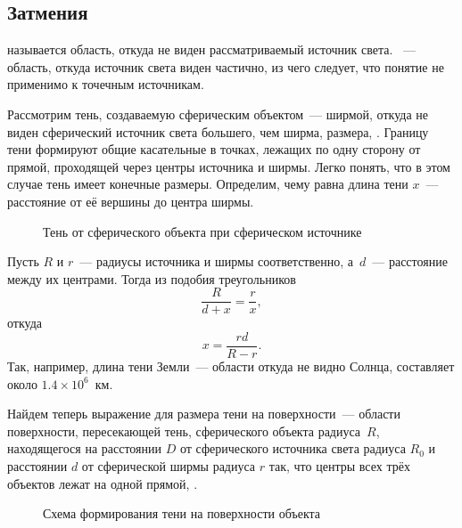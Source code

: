 \subsection{Затмения}
 называется область, откуда не виден рассматриваемый источник света. ~--- область, откуда источник света виден частично, из чего следует, что понятие  не применимо к точечным источникам.

Рассмотрим тень, создаваемую сферическим объектом~--- ширмой, откуда не виден сферический источник света большего, чем ширма, размера, . Границу тени формируют общие касательные в точках, лежащих по одну сторону от прямой, проходящей через центры источника и ширмы. Легко понять, что в этом случае тень имеет конечные размеры. Определим, чему равна длина тени $x$~--- расстояние от её вершины до центра ширмы.

\begin{figure}[h!]
    \centering
    
    \caption{Тень от сферического объекта при сферическом источнике}
    \label{pic:shadow-length}
\end{figure}

Пусть $R$ и $r$~--- радиусы источника и ширмы соответственно, а~$d$~--- расстояние между их центрами. Тогда из подобия треугольников
\begin{equation*}
    \frac{R}{d + x} = \frac{r}{x},
\end{equation*}
откуда
\begin{equation}
    x = \frac{r d}{R - r}.
    \label{eq:eclipses-shadow-length}
\end{equation}
Так, например, длина тени Земли~--- области откуда не видно Солнца, составляет около $1.4 \times 10^{6}$~км.

Найдем теперь выражение для размера тени на поверхности~--- области поверхности, пересекающей тень, сферического объекта радиуса~$R$, находящегося на расстоянии  $D$ от сферического источника света радиуса $R_0$ и расстоянии $d$ от сферической ширмы радиуса $r$ так, что центры всех трёх объектов лежат на одной прямой, .

\begin{figure}[h!]
    \centering
    
    \caption{Схема формирования тени на поверхности объекта}
    \label{pic:shadow-size-on-surface}    
\end{figure}

